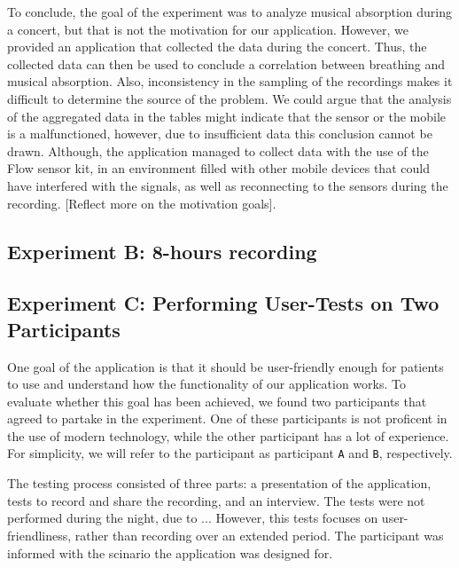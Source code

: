 To conclude, the goal of the experiment was to analyze musical absorption during a concert, but that is not the motivation for our application. However, we provided an application that collected the data during the concert. Thus, the collected data can then be used to conclude a correlation between breathing and musical absorption. Also, inconsistency in the sampling of the recordings makes it difficult to determine the source of the problem. We could argue that the analysis of the aggregated data in the tables might indicate that the sensor or the mobile is a malfunctioned, however, due to insufficient data this conclusion cannot be drawn. Although, the application managed to collect data with the use of the Flow sensor kit, in an environment filled with other mobile devices that could have interfered with the signals, as well as reconnecting to the sensors during the recording. [Reflect more on the motivation goals].

\subsection{Experiment B: 8-hours recording}

\subsection{Experiment C: Performing User-Tests on Two Participants}
One goal of the application is that it should be user-friendly enough for patients to use and understand how the functionality of our application works. To evaluate whether this goal has been achieved, we found two participants that agreed to partake in the experiment. One of these participants is not proficent in the use of modern technology, while the other participant has a lot of experience. For simplicity, we will refer to the participant as participant \verb|A| and \verb|B|, respectively. 

The testing process consisted of three parts: a presentation of the application, tests to record and share the recording, and an interview. The tests were not performed during the night, due to ... However, this tests focuses on user-friendliness, rather than recording over an extended period. The participant was informed with the scinario the application was designed for. 

